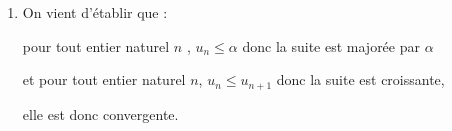 \begin{enumerate}
\begin{enumerate}
Si l'inégalité est vérifiée à l'indice $n$,  alors, elle l'est aussi au rang suivant.

\emph{Conclusion :} L'inégalité est vérifiée à l'indice 0 et sa véracité est héréditaire pour tout indice $n$ naturel, donc, par principe de récurrence, on a  $-1 \leqslant u_n \leqslant u_{n+1} \leqslant\alpha$ pour tout entier naturel $n$.

	\item On vient d'établir que :

pour tout entier naturel $n$ , $u_n \leqslant\alpha$ donc la suite est majorée par $\alpha$

et  pour tout entier naturel $n$, $u_n \leqslant u_{n+1}$ donc la suite est  croissante, 

elle est donc convergente.
	\end{enumerate}
\end{enumerate}

\bigskip
